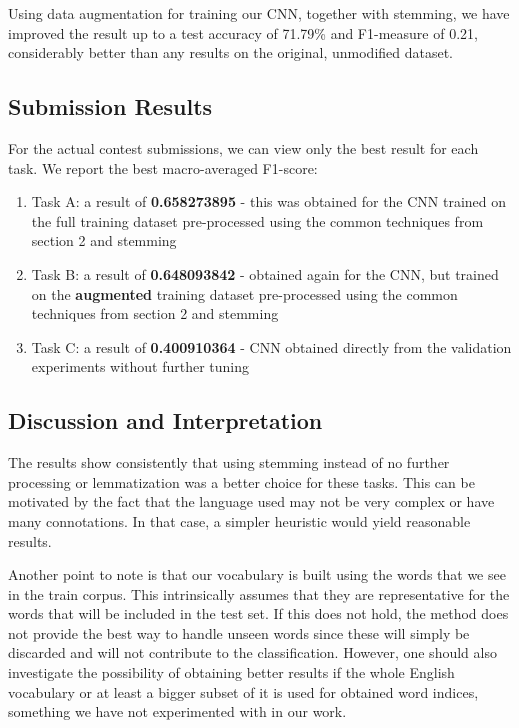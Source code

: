 \documentclass[11pt,a4paper]{article}
\begin{document}
Using data augmentation for training our CNN, together with stemming, we have improved the result up to a test accuracy of 71.79\% and F1-measure of 0.21, considerably better than any results on the original, unmodified dataset.


\subsection{Submission Results}

For the actual contest submissions, we can view only the best result for each task. We report the best macro-averaged F1-score:

\begin{enumerate}
    \item Task A: a result of \textbf{0.658273895} - this was obtained for the CNN trained on the full training dataset pre-processed using the common techniques from section 2 and stemming
    \item Task B: a result of \textbf{0.648093842} - obtained again for the CNN, but trained on the \textbf{augmented} training dataset pre-processed using the common techniques from section 2 and stemming
    \item Task C: a result of \textbf{0.400910364} - CNN obtained directly from the validation experiments without further tuning
\end{enumerate}

\subsection{Discussion and Interpretation}

The results show consistently that using stemming instead of no further processing or lemmatization was a better choice for these tasks. This can be motivated by the fact that the language used may not be very complex or have many connotations. In that case, a simpler heuristic would yield reasonable results.

Another point to note is that our vocabulary is built using the words that we see in the train corpus. This intrinsically assumes that they are representative for the words that will be included in the test set. If this does not hold, the method does not provide the best way to handle unseen words since these will simply be discarded and will not contribute to the classification. However, one should also investigate the possibility of obtaining better results if the whole English vocabulary or at least a bigger subset of it is used for obtained word indices, something we have not experimented with in our work.
\end{document}
